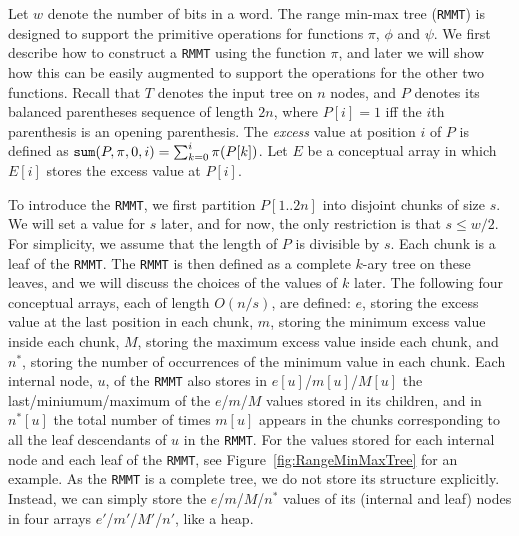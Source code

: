 Let $w$ denote the number of bits in a word. The range min-max tree ({\tt RMMT}) is designed to support the primitive operations for functions $\pi$, $\phi$ and $\psi$. %
We first describe how to construct a {\tt RMMT} using the function $\pi$, and later we will show how this can be easily augmented to support the operations for the other two functions. 
Recall that $T$ denotes the input tree on $n$ nodes, and $P$ denotes its balanced parentheses sequence of length $2n$, where $P[i] = 1$ iff the $i$th parenthesis is an opening parenthesis. 
The {\em excess} value at position $i$ of $P$ is defined as $\mathtt{sum}(P,\pi,0,i) = \sum_{k=0}^{i} \pi(P[k])$. 
Let $E$ be a conceptual array in which $E[i]$ stores the excess value at $P[i]$. 

To introduce the {\tt RMMT}, we first partition $P[1..2n]$ into disjoint chunks of size $s$. We will set a value for $s$ later, and for now, the only restriction is that $s \le w/2$. 
For simplicity, we assume that the length of $P$ is divisible by $s$. 
Each chunk is a leaf of the {\tt RMMT}. The {\tt RMMT} is then defined as a complete $k$-ary tree on these leaves, and we will discuss the choices of the values of $k$ later. %
The following four conceptual arrays, each of length $O(n/s)$, are defined: $e$, storing the excess value at the last position in each chunk, $m$, storing the minimum excess value inside
each chunk, $M$, storing the maximum excess value inside each
chunk, and $n^*$, storing the number of occurrences of the minimum
value in each chunk. 
Each internal node, $u$, of the {\tt RMMT} also stores in $e[u]$/$m[u]$/$M[u]$ the last/miniumum/maximum of the $e$/$m$/$M$ values stored in its children, and in $n^*[u]$ the total number of times $m[u]$ appears in the chunks corresponding to all the leaf descendants of $u$ in the {\tt RMMT}. 
For the values stored for each internal node and each leaf of the {\tt RMMT}, see Figure~\ref{fig:RangeMinMaxTree} for an example. 
As the {\tt RMMT} is a complete tree, we do not store its structure explicitly. 
Instead, we can simply store the $e$/$m$/$M$/$n^*$ values of its (internal and leaf) nodes in four arrays $e'$/$m'$/$M'$/$n'$, like a heap. 

